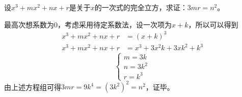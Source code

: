 \documentclass[windows,csize4,answers]{BHCexam}
\begin{document}
\begin{groups}
\begin{questions}[]
        \question[5]  设$x^3+mx^2+nx+r$是关于$x$的一次式的完全立方，求证：$3mr=n^2$。
        \begin{solution}{0.5cm}
            \methodonly 最高次想系数为$0$，考虑采用待定系数法，设一次项为$x+k$，所以可以得到
            \[
                \begin{aligned}
                    x^3+mx^2+nx+r &= (x+k)^3 \\ 
                    x^3+mx^2+nx+r &=x^3+3x^2k+3xk^2+k^3 
                \end{aligned}    
            \]
            \begin{equation}
                \label{eq:8_1}
                \begin{cases}
                    m=3k \\
                    n=3k^2 \\ 
                    r=k^3
                \end{cases}
            \end{equation}
            由上述方程组可得$3mr=9k^4=(3k^2)^2=n^2$，证毕。
        \end{solution}
        \vspace{3.5cm}


\end{questions}
\end{groups}
\end{document}
